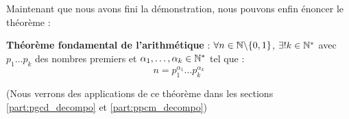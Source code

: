 Maintenant que nous avons fini la démonstration, nous pouvons enfin énoncer le théorème :

\begin{theorem}
\textbf{Théorème fondamental de l'arithmétique} : \newline
$\forall n \in \mathbb{N} \backslash \{0,1\}$, $\exists! k \in \mathbb{N}^{*}$ avec $p_1 \ldots p_k$ des nombres premiers et \newline $\alpha_1, \ldots ,\alpha_k \in \mathbb{N}^{*}$ tel que :
$$n = p_1^{\alpha_1} \ldots p_k^{\alpha_k}$$
\end{theorem}

(Nous verrons des applications de ce théorème dans les sections \ref{part:pgcd_decompo} et \ref{part:ppcm_decompo})